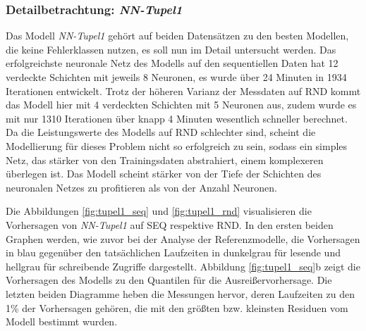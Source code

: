 \documentclass[
	12pt,
	a4paper,
	BCOR10mm,
	DIV14,
	listof=totoc,
	bibliography=totoc,
	headsepline
]{scrreprt}
\begin{document}
\subsubsection{Detailbetrachtung: \textit{NN-Tupel1}}
Das Modell \textit{NN-Tupel1} gehört auf beiden Datensätzen zu den besten Modellen, die keine Fehlerklassen nutzen, es soll nun im Detail untersucht werden.
Das erfolgreichste neuronale Netz des Modells auf den sequentiellen Daten hat 12 verdeckte Schichten mit jeweils 8 Neuronen, es wurde über 24 Minuten in 1934 Iterationen entwickelt.
Trotz der höheren Varianz der Messdaten auf RND kommt das Modell hier mit 4 verdeckten Schichten mit 5 Neuronen aus, zudem wurde es mit nur 1310 Iterationen über knapp 4 Minuten wesentlich schneller berechnet.
Da die Leistungswerte des Modells auf RND schlechter sind, scheint die Modellierung für dieses Problem nicht so erfolgreich zu sein, sodass ein simples Netz, das stärker von den Trainingsdaten abstrahiert, einem komplexeren überlegen ist.
Das Modell scheint stärker von der Tiefe der Schichten des neuronalen Netzes zu profitieren als von der Anzahl Neuronen.\medskip

Die Abbildungen \ref{fig:tupel1_seq} und \ref{fig:tupel1_rnd} visualisieren die Vorhersagen von \textit{NN-Tupel1} auf SEQ respektive RND.
In den ersten beiden Graphen werden, wie zuvor bei der Analyse der Referenzmodelle, die Vorhersagen in blau gegenüber den tatsächlichen Laufzeiten in dunkelgrau für lesende und hellgrau für schreibende Zugriffe dargestellt.
Abbildung \ref{fig:tupel1_seq}b zeigt die Vorhersagen des Modells zu den Quantilen für die Ausreißervorhersage.
Die letzten beiden Diagramme heben die Messungen hervor, deren Laufzeiten zu den 1\% der Vorhersagen gehören, die mit den größten bzw. kleinsten Residuen vom Modell bestimmt wurden.\medskip
\end{document}
